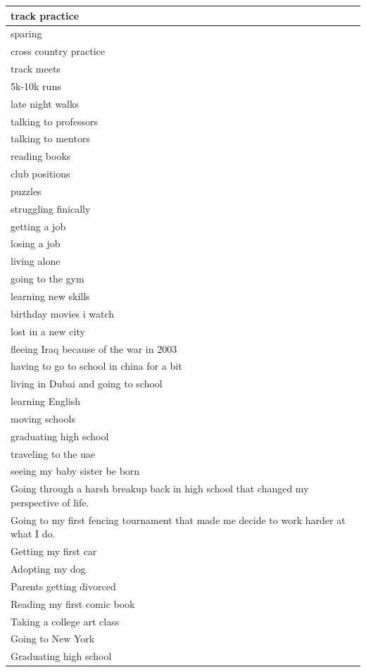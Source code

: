 \documentclass[
  .7em,
  letterpaper,
  DIV=11,
  numbers=noendperiod]{scrartcl}
\begin{document}
\begin{table}
\begin{tabular}{l}
\hline
track practice\\
\hline
sparing\\
\hline
cross country practice\\
\hline
track meets\\
\hline
5k-10k runs\\
\hline
late night walks\\
\hline
talking to professors\\
\hline
talking to mentors\\
\hline
reading books\\
\hline
club positions\\
\hline
puzzles\\
\hline
struggling finically\\
\hline
getting a job\\
\hline
losing a job\\
\hline
living alone\\
\hline
going to the gym\\
\hline
learning new skills\\
\hline
birthday movies i watch\\
\hline
lost in a new city\\
\hline
fleeing Iraq because of the war in 2003\\
\hline
having to go to school in china for a bit\\
\hline
living in Dubai and going to school\\
\hline
learning English\\
\hline
moving schools\\
\hline
graduating high school\\
\hline
traveling to the uae\\
\hline
seeing my baby sister be born\\
\hline
Going through a harsh breakup back in high school that changed my perspective of life.\\
\hline
Going to my first fencing tournament that made me decide to work harder at what I do.\\
\hline
Getting my first car\\
\hline
Adopting my dog\\
\hline
Parents getting divorced\\
\hline
Reading my first comic book\\
\hline
Taking a college art class\\
\hline
Going to New York\\
\hline
Graduating high school\\

\end{tabular}
\end{table}
\end{document}
